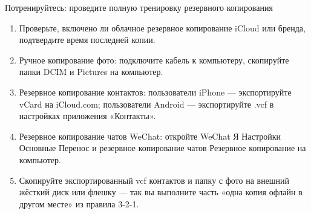 \begin{tcbpractice}{Потренируйтесь: проведите полную тренировку резервного копирования}
\begin{enumerate}
  \item Проверьте, включено ли облачное резервное копирование iCloud или бренда, подтвердите время последней копии.
  \item Ручное копирование фото: подключите кабель к компьютеру, скопируйте папки DCIM и Pictures на компьютер.
  \item Резервное копирование контактов: пользователи iPhone — экспортируйте vCard на iCloud.com; пользователи Android — экспортируйте .vcf в настройках приложения «Контакты».
  \item Резервное копирование чатов WeChat: откройте WeChat Я Настройки Основные Перенос и резервное копирование чатов Резервное копирование на компьютер.
  \item Скопируйте экспортированный vcf контактов и папку с фото на внешний жёсткий диск или флешку — так вы выполните часть «одна копия офлайн в другом месте» из правила 3-2-1.
\end{enumerate}

\end{tcbpractice}
